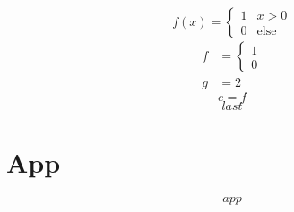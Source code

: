 \documentclass{article}
\begin{document}
\begin{equation} f(x) = \begin{cases} 1 & x > 0 \\ 0 & \text{else} \end{cases} \label{ca:1} \end{equation}
\begin{align} f &= \begin{cases} 1 \\ 0 \end{cases} \label{ca:2} \\ g &= 2 \label{ca:3} \end{align}
\begin{equation} \tag{X} e = f \label{tg:x} \end{equation}
\begin{equation} last \label{eq:last} \end{equation}
\appendix
\section{App}
\begin{equation} app \label{eq:app} \end{equation}
\end{document}
